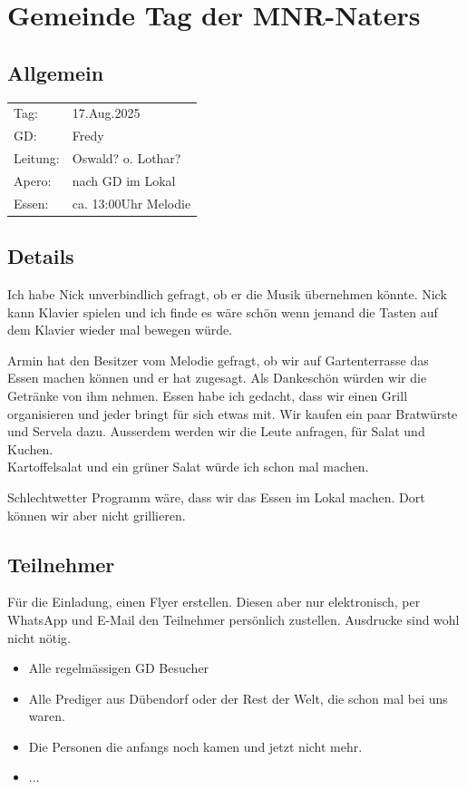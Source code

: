 \documentclass{mybib}
\begin{document}
    \section*{Gemeinde Tag der MNR-Naters}
    \subsection*{Allgemein}
    
    \begin{tabular}{ l l }
         Tag: & 17.Aug.2025 \\ 
         GD: & Fredy \\  
         Leitung: & Oswald? o. Lothar? \\   
         Apero: & nach GD im Lokal \\
         Essen: & ca. 13:00Uhr Melodie
    \end{tabular}
    \subsection*{Details}
    Ich habe Nick unverbindlich gefragt, ob er die Musik übernehmen könnte. Nick kann Klavier spielen und ich finde es wäre schön wenn jemand die Tasten auf dem Klavier wieder mal bewegen würde.

    Armin hat den Besitzer vom Melodie gefragt, ob wir auf Gartenterrasse das Essen machen können und er hat zugesagt. Als Dankeschön würden wir die Getränke von ihm nehmen.
    Essen habe ich gedacht, dass wir einen Grill organisieren und jeder bringt für sich etwas mit. Wir kaufen ein paar Bratwürste und Servela dazu. Ausserdem werden wir die Leute anfragen, für Salat und Kuchen.\\
    Kartoffelsalat und ein grüner Salat würde ich schon mal machen.

    Schlechtwetter Programm wäre, dass wir das Essen im Lokal machen. Dort können wir aber nicht grillieren. 

    \subsection*{Teilnehmer}
    Für die Einladung, einen Flyer erstellen. Diesen aber nur elektronisch, per WhatsApp und E-Mail den Teilnehmer persönlich zustellen. Ausdrucke sind wohl nicht nötig.
    \begin{itemize}
        \item Alle regelmässigen GD Besucher
        \item Alle Prediger aus Dübendorf oder der Rest der Welt, die schon mal bei uns waren.
        \item Die Personen die anfangs noch kamen und jetzt nicht mehr.
        \item ...
    \end{itemize}      
    
\end{document}
